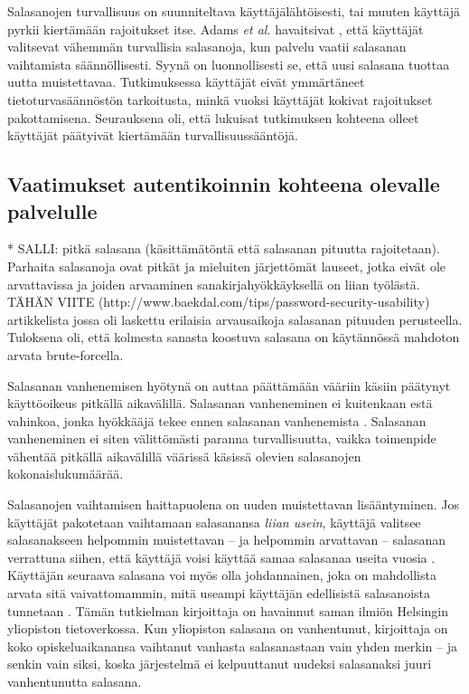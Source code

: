\documentclass[english,gradu]{tktltiki}
\begin{document}
         Salasanojen turvallisuus on suunniteltava käyttäjälähtöisesti, tai muuten käyttäjä pyrkii kiertämään rajoitukset itse. Adams \emph{et al.} havaitsivat \cite{users_are_not_the_enemy_99}, että käyttäjät valitsevat vähemmän turvallisia salasanoja, kun palvelu vaatii salasanan vaihtamista säännöllisesti. Syynä on luonnollisesti se, että uusi salasana tuottaa uutta muistettavaa. Tutkimuksessa käyttäjät eivät ymmärtäneet tietoturvasäännöstön tarkoitusta, minkä vuoksi käyttäjät kokivat rajoitukset pakottamisena. Seurauksena oli, että lukuisat tutkimuksen kohteena olleet käyttäjät päätyivät kiertämään turvallisuussääntöjä.



\subsection{Vaatimukset autentikoinnin kohteena olevalle palvelulle} %
\label{sub:vaatimukset_autentikoinnin_kohteena_olevalle_palvelulle}

* SALLI: pitkä salasana (käsittämätöntä että salasanan pituutta rajoitetaan). Parhaita salasanoja ovat pitkät ja mieluiten järjettömät lauseet, jotka eivät ole arvattavissa ja joiden arvaaminen sanakirjahyökkäyksellä on liian työlästä. TÄHÄN VIITE (http://www.baekdal.com/tips/password-security-usability) artikkelista jossa oli laskettu erilaisia arvausaikoja salasanan pituuden perusteella. Tuloksena oli, että kolmesta sanasta koostuva salasana on käytännössä mahdoton arvata brute-forcella.

Salasanan vanhenemisen hyötynä on auttaa päättämään vääriin käsiin päätynyt käyttöoikeus pitkällä aikavälillä. Salasanan vanheneminen ei kuitenkaan estä vahinkoa, jonka hyökkääjä tekee ennen salasanan vanhenemista \cite{lopsa_pw_expiry_06}. Salasanan vanheneminen ei siten välittömästi paranna turvallisuutta, vaikka toimenpide vähentää pitkällä aikavälillä väärissä käsissä olevien salasanojen kokonaislukumäärää.

Salasanojen vaihtamisen haittapuolena on uuden muistettavan lisääntyminen. Jos käyttäjät pakotetaan vaihtamaan salasanansa \emph{liian usein}, käyttäjä valitsee salasanakseen helpommin muistettavan -- ja helpommin arvattavan -- salasanan verrattuna siihen, että käyttäjä voisi käyttää samaa salasanaa useita vuosia \cite{schneier_changing_passwords_10}. Käyttäjän seuraava salasana voi myös olla johdannainen, joka on mahdollista arvata sitä vaivattomammin, mitä useampi käyttäjän edellisistä salasanoista tunnetaan \cite{password_expiration_10}. Tämän tutkielman kirjoittaja on havainnut saman ilmiön Helsingin yliopiston tietoverkossa. Kun yliopiston salasana on vanhentunut, kirjoittaja on koko opiskeluaikanansa vaihtanut vanhasta salasanastaan vain yhden merkin -- ja senkin vain siksi, koska järjestelmä ei kelpuuttanut uudeksi salasanaksi juuri vanhentunutta salasana.
\end{document}
